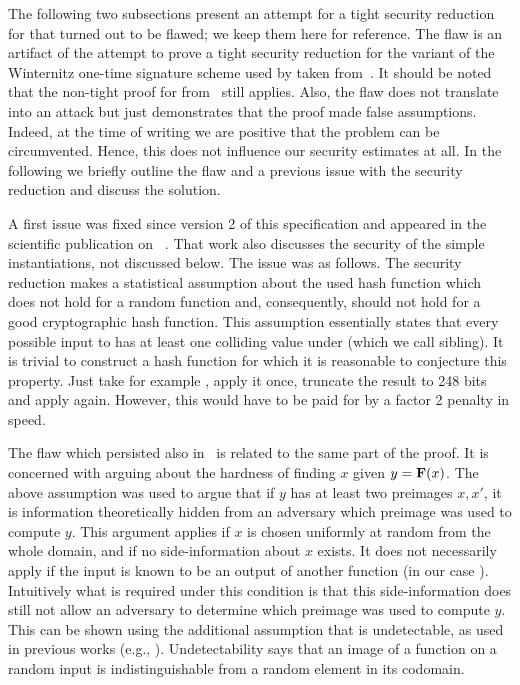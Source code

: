 

The following two subsections present an attempt for a tight security reduction 
for \spx that turned out to be flawed; we keep them here for reference. The flaw is 
an artifact of the attempt to prove a tight security reduction for the variant 
of the Winternitz one-time signature scheme used by \spx taken 
from~\cite{Huelsing2016}. It should be noted that the non-tight proof for 
\wotsp from~\cite{Hulsing2013} still applies. Also, the flaw does not translate 
into an attack but just demonstrates that the proof made false assumptions. 
Indeed, at the time of writing we are positive that the problem can be 
circumvented. Hence, this does not influence our security estimates at all. In 
the following we briefly outline the flaw and a previous issue with the 
security reduction and discuss the solution.

A first issue was fixed since version 2 of this specification and appeared in 
the scientific publication on \spx~\cite{SPXCCS}. That work also discusses the 
security of the simple instantiations, not discussed below. The issue was as 
follows.
The security reduction makes a statistical 
assumption about the used 
hash 
function which does not hold for a random function and, consequently, should 
not 
hold for a good cryptographic hash function. This assumption essentially states 
that every possible input to \sphincsF has at least one colliding value under 
\sphincsF (which we call sibling). 
It is trivial to construct a hash function for which it is reasonable 
to conjecture this property. Just take for example \shatwofs, apply it once, 
truncate the result to 248 bits and apply \shatwofs again. However, this would 
have to be paid for by a factor 2 penalty in speed. 

The flaw which persisted also in~\cite{SPXCCS} is related to the 
same part of the proof. It is concerned with arguing about the hardness of 
finding $x$ given $y = \mathbf{F}(x)$. The above assumption was used to argue 
that if $y$ has at least two preimages $x,x'$, it is information 
theoretically hidden from an adversary which preimage was used to compute $y$. 
This argument applies if $x$ is chosen uniformly at random 
from the whole domain, and if no side-information about $x$ exists. It 
does not necessarily apply if the input is known to be an output of another 
function (in our case \sphincsF). Intuitively what is required under this 
condition is that this side-information does still not allow an adversary to 
determine which preimage was used to compute $y$. This can be shown using the 
additional assumption that \sphincsF is undetectable, as used in previous 
works (e.g., \cite{Hulsing2013}). Undetectability says that an image of a 
function on a random input is indistinguishable from a random element in its 
codomain.

